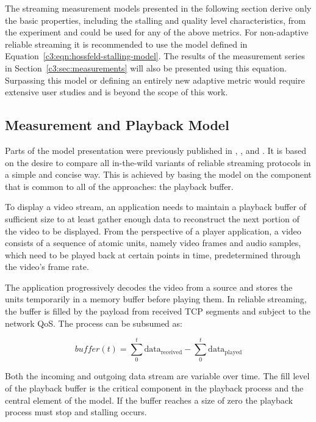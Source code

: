 The streaming measurement models presented in the following section derive only the basic properties, including the stalling and quality level characteristics, from the experiment and could be used for any of the above metrics. For non-adaptive reliable streaming it is recommended to use the model defined in Equation~\ref{c3:eqn:hossfeld-stalling-model}. The results of the measurement series in Section~\ref{c3:sec:measurements} will also be presented using this equation. Surpassing this model or defining an entirely new adaptive metric would require extensive user studies and is beyond the scope of this work.

\subsection{Measurement and Playback Model}
\label{c3:sec:model}

Parts of the model presentation were previously published in \cite{cs3518}, \cite{metzger2011delivery}, and \cite{6229739}. It is based on the desire to compare all in-the-wild variants of reliable streaming protocols in a simple and concise way. This is achieved by basing the model on the component that is common to all of the approaches: the playback buffer.

To display a video stream, an application needs to maintain a playback buffer of sufficient size to at least gather enough data to reconstruct the next portion of the video to be displayed. From the perspective of a player application, a video consists of a sequence of atomic units, namely video frames and audio samples, which need to be played back at certain points in time, predetermined through the video's frame rate. 

The application progressively decodes the video from a source and stores the units temporarily in a memory buffer before playing them. In reliable streaming, the buffer is filled by the payload from received \gls{TCP} segments and subject to the network \gls{QoS}. The process can be subsumed as:

\begin{equation*}
	\mathit{buffer}(t) = \sum_{0}^{t} \text{data}_\mathrm{received} - \sum_{0}^{t} \text{data}_\mathrm{played}
\end{equation*}

Both the incoming and outgoing data stream are variable over time. The fill level of the playback buffer is the critical component in the playback process and the central element of the model. If the buffer reaches a size of zero the playback process must stop and stalling occurs.

